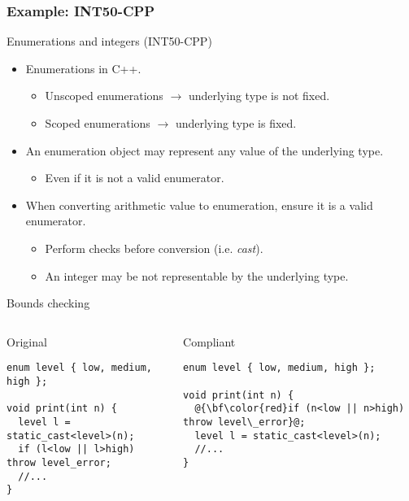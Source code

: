 \subsubsection{Example: INT50-CPP}

\begin{frame}[t]{Enumerations and integers (INT50-CPP)}
\begin{itemize}
  \item Enumerations in C++.
    \begin{itemize}
      \item Unscoped enumerations $\rightarrow$ underlying type is not fixed.
      \item Scoped enumerations $\rightarrow$ underlying type is fixed.
    \end{itemize}

  \vfill
  \item An enumeration object may represent any value of the underlying type.
    \begin{itemize}
      \item Even if it is not a valid enumerator.
    \end{itemize}

  \vfill
  \item When converting arithmetic value to enumeration, ensure it is a valid enumerator.
    \begin{itemize}
      \item Perform checks before conversion (i.e. \emph{cast}).
      \item An integer may be not representable by the underlying type.
    \end{itemize}
\end{itemize}
\end{frame}

\begin{frame}[t,fragile]{Bounds checking}
\begin{columns}

\begin{block}{Original}
\begin{lstlisting}
enum level { low, medium, high };

void print(int n) {
  level l = static_cast<level>(n);
  if (l<low || l>high) throw level_error;
  //...
}
\end{lstlisting}
\end{block}

\pause
{}
\begin{block}{Compliant}
\begin{lstlisting}[escapechar=@]
enum level { low, medium, high };

void print(int n) {
  @{\bf\color{red}if (n<low || n>high) throw level\_error}@;
  level l = static_cast<level>(n);
  //...
}
\end{lstlisting}
\end{block}

\end{columns}
\end{frame}

